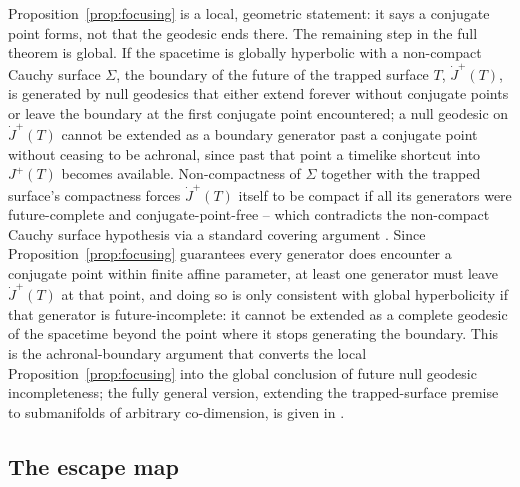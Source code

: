 \documentclass[11pt]{article}
\begin{document}
Proposition~\ref{prop:focusing} is a local, geometric statement: it says a conjugate point forms, not that the geodesic ends there. The remaining step in the full theorem is global. If the spacetime is globally hyperbolic with a non-compact Cauchy surface $\Sigma$, the boundary of the future of the trapped surface $T$, $\dot J^+(T)$, is generated by null geodesics that either extend forever without conjugate points or leave the boundary at the first conjugate point encountered; a null geodesic on $\dot J^+(T)$ cannot be extended as a boundary generator past a conjugate point without ceasing to be achronal, since past that point a timelike shortcut into $J^+(T)$ becomes available. Non-compactness of $\Sigma$ together with the trapped surface's compactness forces $\dot J^+(T)$ itself to be compact if all its generators were future-complete and conjugate-point-free -- which contradicts the non-compact Cauchy surface hypothesis via a standard covering argument \cite{hawkingellis1973}. Since Proposition~\ref{prop:focusing} guarantees every generator does encounter a conjugate point within finite affine parameter, at least one generator must leave $\dot J^+(T)$ at that point, and doing so is only consistent with global hyperbolicity if that generator is future-incomplete: it cannot be extended as a complete geodesic of the spacetime beyond the point where it stops generating the boundary. This is the achronal-boundary argument that converts the local Proposition~\ref{prop:focusing} into the global conclusion of future null geodesic incompleteness; the fully general version, extending the trapped-surface premise to submanifolds of arbitrary co-dimension, is given in \cite{gallowaysenovilla2010}.

\subsection{The escape map}
\end{document}
